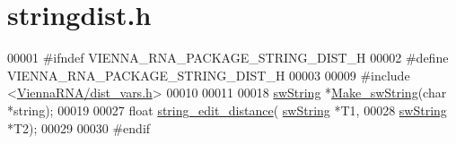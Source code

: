 \hypertarget{stringdist_8h_source}{}\section{stringdist.\+h}
\label{stringdist_8h_source}

\begin{DoxyCode}
00001 \textcolor{preprocessor}{#ifndef VIENNA\_RNA\_PACKAGE\_STRING\_DIST\_H}
00002 \textcolor{preprocessor}{#define VIENNA\_RNA\_PACKAGE\_STRING\_DIST\_H}
00003 
00009 \textcolor{preprocessor}{#include <\mbox{\hyperlink{dist__vars_8h}{ViennaRNA/dist\_vars.h}}>}
00010 
00011 
00018 \mbox{\hyperlink{structsw_string}{swString}} *\mbox{\hyperlink{stringdist_8h_a3125991b3a403b3f89230474deb3f22e}{Make\_swString}}(\textcolor{keywordtype}{char} *\textcolor{keywordtype}{string});
00019 
00027 \textcolor{keywordtype}{float}     \mbox{\hyperlink{stringdist_8h_a89e3c335ef17780576d7c0e713830db9}{string\_edit\_distance}}( \mbox{\hyperlink{structsw_string}{swString}} *T1,
00028                                 \mbox{\hyperlink{structsw_string}{swString}} *T2);
00029 
00030 \textcolor{preprocessor}{#endif}
\end{DoxyCode}
